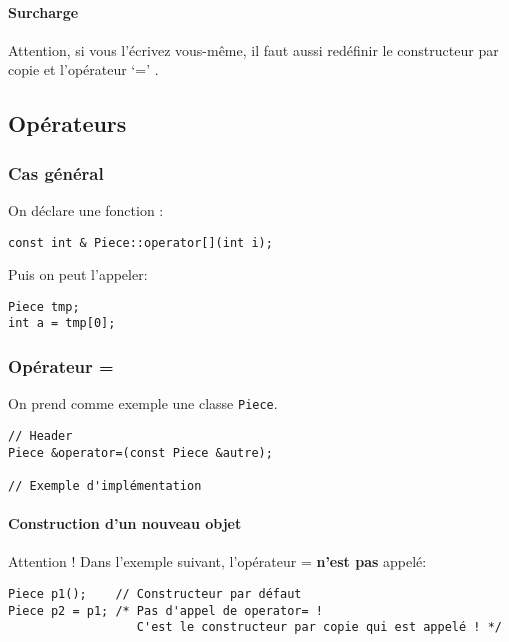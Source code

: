 \documentclass[10pt,a4paper,french]{article}
\begin{document}
\paragraph{Surcharge}
Attention, si vous l'écrivez vous-même, il faut aussi redéfinir le constructeur par copie  et l'opérateur `=' .

\subsection{Opérateurs}

\subsubsection{Cas général}

On déclare une fonction :

\begin{verbatim}
const int & Piece::operator[](int i);
\end{verbatim}

Puis on peut l'appeler:

\begin{verbatim}
Piece tmp;
int a = tmp[0];
\end{verbatim}

\subsubsection{Opérateur =\label{operator-equals}}

On prend comme exemple une classe {\tt Piece}.

\begin{verbatim}
// Header
Piece &operator=(const Piece &autre);

// Exemple d'implémentation

\end{verbatim}

\paragraph{Construction d'un nouveau objet}

Attention ! Dans l'exemple suivant, l'opérateur = \textbf{n'est pas} appelé:
\begin{verbatim}
Piece p1();    // Constructeur par défaut
Piece p2 = p1; /* Pas d'appel de operator= !
                  C'est le constructeur par copie qui est appelé ! */
\end{verbatim}
\end{document}

